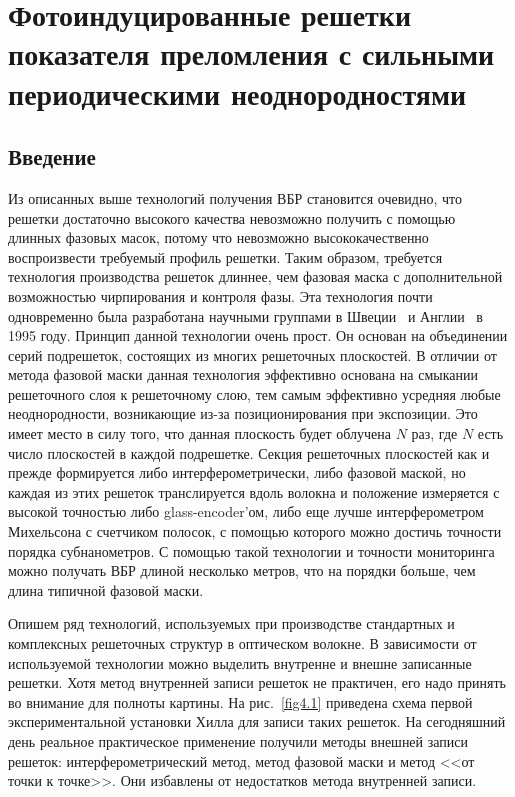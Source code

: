 \chapter{Фотоиндуцированные решетки показателя преломления с сильными периодическими неоднородностями} \label{chapt3}

\section{Введение}
\label{sec:intro}

Из описанных выше технологий получения ВБР становится очевидно, что решетки достаточно высокого качества невозможно получить с помощью длинных фазовых масок, потому что невозможно высококачественно воспроизвести требуемый профиль решетки. Таким образом, требуется технология производства решеток длиннее, чем фазовая маска с дополнительной возможностью чирпирования и контроля фазы. Эта технология почти одновременно была разработана научными группами в Швеции~\cite{Stubbe95} и Англии~\cite{Cole95} в 1995 году. Принцип данной технологии очень прост. Он основан на объединении серий подрешеток, состоящих из многих решеточных плоскостей. В отличии от метода фазовой маски данная технология эффективно основана на смыкании решеточного слоя к решеточному слою, тем самым эффективно усредняя любые неоднородности, возникающие из-за позиционирования при экспозиции. Это имеет место в силу того, что данная плоскость будет облучена $N$ раз, где $N$ есть число плоскостей в каждой подрешетке. Секция решеточных плоскостей как и прежде формируется либо интерферометрически, либо фазовой маской, но каждая из этих решеток транслируется вдоль волокна и положение измеряется с высокой точностью либо glass-encoder'ом, либо еще лучше интерферометром Михельсона с счетчиком полосок, с помощью которого можно достичь точности порядка субнанометров. С помощью такой технологии и точности мониторинга можно получать ВБР длиной несколько метров, что на порядки больше, чем длина типичной фазовой маски.

Опишем ряд технологий, используемых при производстве стандартных и комплексных решеточных структур в оптическом волокне. В зависимости от используемой технологии можно выделить внутренне и внешне записанные решетки. Хотя метод внутренней записи решеток не практичен, его надо принять во внимание для полноты картины. На рис.~\ref{fig4.1} приведена схема первой экспериментальной установки Хилла для записи таких решеток. На сегодняшний день реальное практическое применение получили методы внешней записи решеток: интерферометрический метод, метод фазовой маски и метод <<от точки к точке>>. Они избавлены от недостатков метода внутренней записи.

